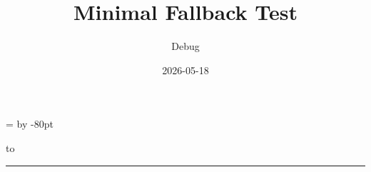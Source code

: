 \documentclass[a4paper,11pt]{article}
\title{Minimal Fallback Test}
\author{Debug}
\date{2026-05-18}
\begin{document}
\maketitle

\newdimen\testht
\testht=\textheight
\advance\testht by -80pt

\vbox to\testht{%
  \lipsum[1-3]%
  \vss
}%

\begin{swarmwrap}%
  \begin{minipage}[t]{3cm}
    \centering
    \rule{\linewidth}{3.8cm}
  \end{minipage}%
\end{swarmwrap}%
\swarmwrapnext
\lipsum[1-3]
\end{document}
